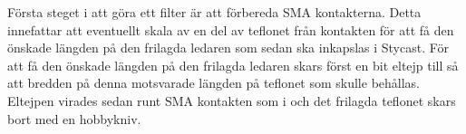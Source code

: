 \documentclass[main.tex]{subfiles}
\begin{document}




Första steget i att göra ett filter är att förbereda SMA kontakterna. Detta innefattar att eventuellt skala av en del av teflonet från kontakten för att få den önskade längden på den frilagda ledaren som sedan ska inkapslas i Stycast. För att få den önskade längden på den frilagda ledaren skars först en bit eltejp till så att bredden på denna motsvarade längden på teflonet som skulle behållas. Eltejpen virades sedan runt SMA kontakten som i  och det frilagda teflonet skars bort med en hobbykniv. 
\end{document}
